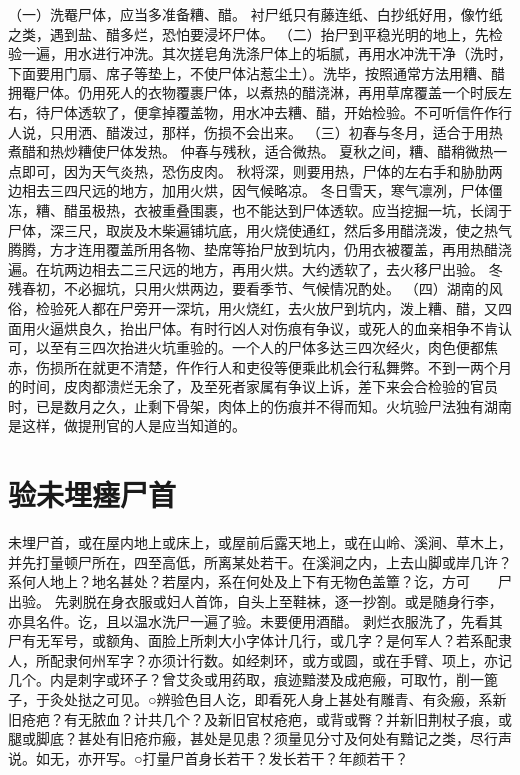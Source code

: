 \documentclass[12pt,UTF8]{ctexbook}
\begin{document}
（一）洗罨尸体，应当多准备糟、醋。
衬尸纸只有藤连纸、白抄纸好用，像竹纸之类，遇到盐、醋多烂，恐怕要浸坏尸体。
（二）抬尸到平稳光明的地上，先检验一遍，用水进行冲洗。其次搓皂角洗涤尸体上的垢腻，再用水冲洗干净（洗时，下面要用门扇、席子等垫上，不使尸体沾惹尘土）。洗毕，按照通常方法用糟、醋拥罨尸体。仍用死人的衣物覆裹尸体，以煮热的醋浇淋，再用草席覆盖一个时辰左右，待尸体透软了，便拿掉覆盖物，用水冲去糟、醋，开始检验。不可听信仵作行人说，只用洒、醋泼过，那样，伤损不会出来。
（三）初春与冬月，适合于用热煮醋和热炒糟使尸体发热。
仲春与残秋，适合微热。
夏秋之间，糟、醋稍微热一点即可，因为天气炎热，恐伤皮肉。
秋将深，则要用热，尸体的左右手和胁肋两边相去三四尺远的地方，加用火烘，因气候略凉。
冬日雪天，寒气凛冽，尸体僵冻，糟、醋虽极热，衣被重叠围裹，也不能达到尸体透软。应当挖掘一坑，长阔于尸体，深三尺，取炭及木柴遍铺坑底，用火烧使通红，然后多用醋浇泼，使之热气腾腾，方才连用覆盖所用各物、垫席等抬尸放到坑内，仍用衣被覆盖，再用热醋浇遍。在坑两边相去二三尺远的地方，再用火烘。大约透软了，去火移尸出验。
冬残春初，不必掘坑，只用火烘两边，要看季节、气候情况酌处。
（四）湖南的风俗，检验死人都在尸旁开一深坑，用火烧红，去火放尸到坑内，泼上糟、醋，又四面用火逼烘良久，抬出尸体。有时行凶人对伤痕有争议，或死人的血亲相争不肯认可，以至有三四次抬进火坑重验的。一个人的尸体多达三四次经火，肉色便都焦赤，伤损所在就更不清楚，仵作行人和吏役等便乘此机会行私舞弊。不到一两个月的时间，皮肉都溃烂无余了，及至死者家属有争议上诉，差下来会合检验的官员时，已是数月之久，止剩下骨架，肉体上的伤痕并不得而知。火坑验尸法独有湖南是这样，做提刑官的人是应当知道的。


\chapter{验未埋瘗尸首}

未埋尸首，或在屋内地上或床上，或屋前后露天地上，或在山岭、溪涧、草木上，并先打量顿尸所在，四至高低，所离某处若干。在溪涧之内，上去山脚或岸几许？系何人地上？地名甚处？若屋内，系在何处及上下有无物色盖簟？讫，方可　　尸出验。
先剥脱在身衣服或妇人首饰，自头上至鞋袜，逐一抄劄。或是随身行李，亦具名件。讫，且以温水洗尸一遍了验。未要便用酒醋。
剥烂衣服洗了，先看其尸有无军号，或额角、面脸上所刺大小字体计几行，或几字？是何军人？若系配隶人，所配隶何州军字？亦须计行数。如经刺环，或方或圆，或在手臂、项上，亦记几个。内是刺字或环子？曾艾灸或用药取，痕迹黯漤及成疤瘢，可取竹，削一篦子，于灸处挞之可见。○辨验色目人讫，即看死人身上甚处有雕青、有灸瘢，系新旧疮疤？有无脓血？计共几个？及新旧官杖疮疤，或背或臀？并新旧荆杖子痕，或腿或脚底？甚处有旧疮疖瘢，甚处是见患？须量见分寸及何处有黯记之类，尽行声说。如无，亦开写。○打量尸首身长若干？发长若干？年颜若干？
\end{document}
